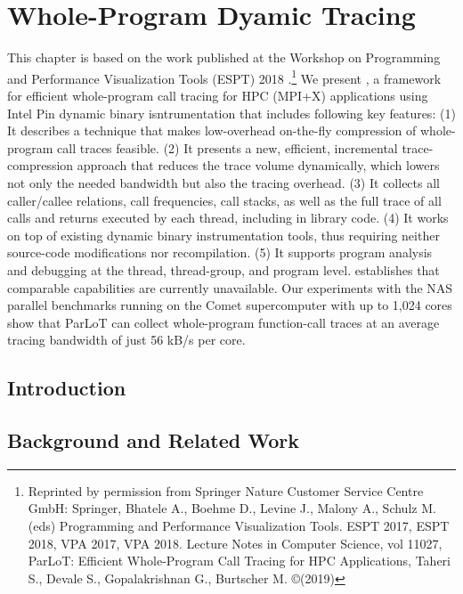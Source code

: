 
\chapter{Whole-Program Dyamic Tracing}
\label{sec:ch2}

This chapter is based on the work published at the Workshop on Programming and Performance Visualization Tools (ESPT) 2018 \cite{parlot}.\footnote{Reprinted by permission from Springer Nature Customer Service Centre GmbH: Springer, Bhatele A., Boehme D., Levine J., Malony A., Schulz M. (eds) Programming and Performance Visualization Tools. ESPT 2017, ESPT 2018, VPA 2017, VPA 2018. Lecture Notes in Computer Science, vol 11027, ParLoT: Efficient Whole-Program Call Tracing for HPC Applications, Taheri S., Devale S., Gopalakrishnan G., Burtscher M. \copyright (2019)}
We present \parlot, a framework for efficient whole-program call tracing for HPC (MPI+X) applications using Intel Pin \cite{pin} dynamic binary isntrumentation that includes following key features: (1) It describes a technique that makes low-overhead on-the-fly compression of whole-program call traces feasible. (2) It presents a new, efficient, incremental trace-compression approach that reduces the trace volume dynamically, which lowers not only the needed bandwidth but also the tracing overhead. (3) It collects all caller/callee relations, call frequencies, call stacks, as well as the full trace of all calls and returns executed by each thread, including in library code. (4) It works on top of existing dynamic binary instrumentation tools, thus requiring neither source-code modifications nor recompilation. (5) It supports program analysis and debugging at the thread, thread-group, and program level.
\parlot establishes that comparable capabilities are currently unavailable. Our experiments with the NAS parallel benchmarks running on the Comet supercomputer with up to 1,024 cores show that ParLoT can collect whole-program function-call traces at an average tracing bandwidth of just 56 kB/s per core.


\section{Introduction}
\label{sec:ch2_intro}



\section{Background and Related Work}
\label{sec:ch2_bgreltool}


